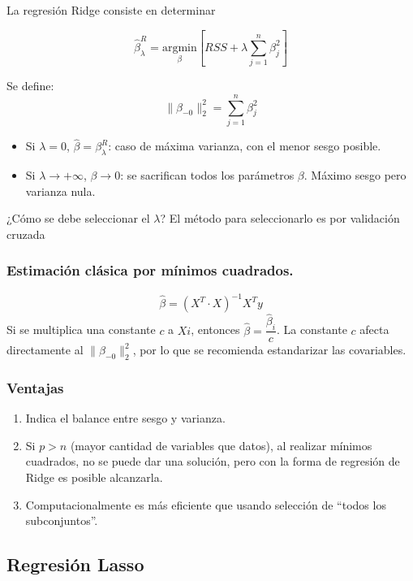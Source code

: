 \documentclass[
  12pt,
]{book}
\providecommand{\tightlist}{%
  \setlength{\itemsep}{0pt}\setlength{\parskip}{0pt}}
\theoremstyle{definition}
\theoremstyle{definition}
\theoremstyle{definition}
\theoremstyle{remark}
\begin{document}
La regresión Ridge consiste en determinar

\[ \hat\beta^R_\lambda = \underset{\beta}{\mathrm{argmin}}\left[RSS + \lambda\sum_{j=1}^n\beta_j^2\right]\]

Se define:
\[\|\beta_{-0}\|^2_2 = \sum_{j=1}^{n}\beta_j^2\]

\begin{itemize}
\tightlist
\item
  Si \(\lambda = 0\), \(\hat\beta = \beta^R_\lambda\): caso de máxima varianza, con el menor sesgo posible.
\item
  Si \(\lambda \to +\infty\), \(\beta \to 0\): se sacrifican todos los parámetros \(\beta\). Máximo sesgo pero varianza nula.
\end{itemize}

¿Cómo se debe seleccionar el \(\lambda\)?
El método para seleccionarlo es por validación cruzada

\hypertarget{estimaciuxf3n-cluxe1sica-por-muxednimos-cuadrados.}{%
\subsubsection{Estimación clásica por mínimos cuadrados.}\label{estimaciuxf3n-cluxe1sica-por-muxednimos-cuadrados.}}

\[ \hat\beta = (X^T\cdot X)^{-1}X^Ty\]
Si se multiplica una constante \(c\) a \(Xi\), entonces \(\hat\beta = \dfrac{\hat\beta_i}{c}\). La constante \(c\) afecta directamente al \(\|\beta_{-0}\|^2_2\), por lo que se recomienda estandarizar las covariables.

\hypertarget{ventajas}{%
\subsubsection{Ventajas}\label{ventajas}}

\begin{enumerate}
\def\labelenumi{\arabic{enumi}.}
\tightlist
\item
  Indica el balance entre sesgo y varianza.
\item
  Si \(p>n\) (mayor cantidad de variables que datos), al realizar mínimos cuadrados, no se puede dar una solución, pero con la forma de regresión de Ridge es posible alcanzarla.
\item
  Computacionalmente es más eficiente que usando selección de \enquote{todos los subconjuntos}.
\end{enumerate}

\hypertarget{regresiuxf3n-lasso}{%
\subsection{Regresión Lasso}\label{regresiuxf3n-lasso}}
\end{document}
